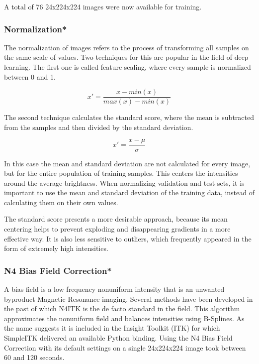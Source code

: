 A total of 76 24x224x224 images were now available for training.

\subsubsection{Normalization*}

The normalization of images refers to the process of transforming all samples on the same scale of values. Two techniques for this are popular in the field of deep learning. The first one is called feature scaling, where every sample is normalized between 0 and 1.

\begin{figure}
\[x' = \frac {x - min(x)}{max(x) - min(x)}\]
\end{figure}

The second technique calculates the standard score, where the mean is subtracted from the samples and then divided by the standard deviation.

\begin{figure}
\[x' = \frac {x - \mu}{\sigma}\]
\end{figure}

In this case the mean and standard deviation are not calculated for every image, but for the entire population of training samples. This centers the intensities around the average brightness. When normalizing validation and test sets, it is important to use the mean and standard deviation of the training data, instead of calculating them on their own values.

The standard score presents a more desirable approach, because its mean centering helps to prevent exploding and disappearing gradients in a more effective way. It is also less sensitive to outliers, which frequently appeared in the form of extremely high intensities. 

\subsubsection{N4 Bias Field Correction*}

A bias field is a low frequency nonuniform intensity that is an unwanted byproduct Magnetic Resonance imaging. Several methods have been developed in the past of which N4ITK \cite{Tustison2010} is the de facto standard in the field. This algorithm approximates the nonuniform field and balances intensities using B-Splines. As the name suggests it is included in the Insight Toolkit (ITK) for which SimpleITK delivered an available Python binding. Using the N4 Bias Field Correction with its default settings on a single 24x224x224 image took between 60 and 120 seconds.

